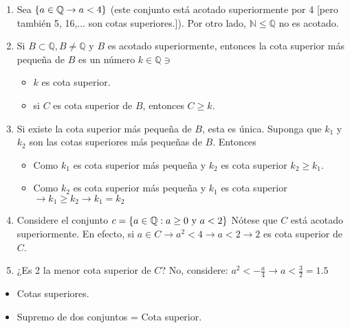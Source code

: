 \begin{example}
\begin{enumerate}
    \item Sea $\{a\in \mathbb{Q}\to a<4\}$ (este conjunto está acotado superiormente por 4 [pero también 5, 16,... son cotas superiores.]). Por otro lado, $\mathbb{N} \leq \mathbb{Q}$ no es acotado. 
    \item Si $B\subset \mathbb{Q}, B\neq \mathbb{Q}$ y $B$ es acotado superiormente, entonces la cota superior más pequeña de $B$ es un número $k\in \mathbb{Q}\ni$
    \begin{itemize}
        \item $k$ es cota superior.
        \item si $C$ es cota superior de $B$, entonces $C\geq k$. 
    \end{itemize}
    \item Si existe la cota superior más pequeña de $B$, esta es única. \newline 
    Suponga que $k_1$ y $k_2$ son las cotas superiores más pequeñas de $B$. Entonces
    \begin{itemize}
        \item Como $k_1$ es cota superior más pequeña y $k_2$ es cota superior $k_2\geq k_1$. 
        \item Como $k_2$ es cota superior más pequeña y $k_1$ es cota superior $\to k_1\geq k_2\to k_1=k_2$
    \end{itemize}
    \item Considere el conjunto $c=\{a\in \mathbb{Q}: a\geq 0 \text{ y } a<2\}$ Nótese que $C$ está acotado superiormente. En efecto, si $a\in C\to a^2<4\to a<2\to 2$ es cota superior de $C$. 
    \item ¿Es 2 la menor cota superior de $C$? No, considere: $a^2 < -\frac{a}{4}\to a<\frac{3}{2}=1.5$
\end{enumerate}
\end{example}

\begin{kaobox}[frametitle=Para investigar]
\begin{itemize}
    \item Cotas superiores.
    \item Supremo de dos conjuntos = Cota superior. 
\end{itemize}
\end{kaobox}

